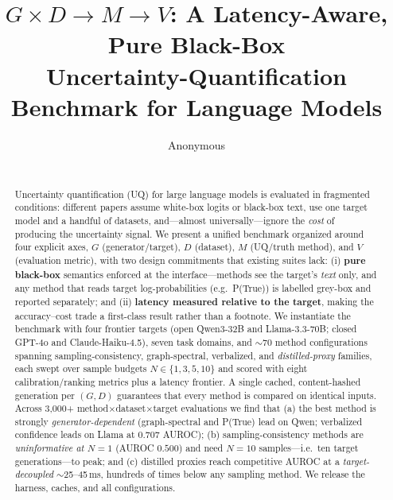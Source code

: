 \documentclass[11pt]{article}
\title{$G\times D\to M\to V$: A Latency-Aware, Pure Black-Box \\
Uncertainty-Quantification Benchmark for Language Models}
\author{Anonymous \\ \texttt{} \\}
\begin{document}
\maketitle

\begin{abstract}
Uncertainty quantification (UQ) for large language models is evaluated in fragmented
conditions: different papers assume white-box logits or black-box text, use one target
model and a handful of datasets, and---almost universally---ignore the \emph{cost} of
producing the uncertainty signal. We present a unified benchmark organized around four
explicit axes, $G$ (generator/target), $D$ (dataset), $M$ (UQ/truth method), and $V$
(evaluation metric), with two design commitments that existing suites lack: (i)
\textbf{pure black-box} semantics enforced at the interface---methods see the target's
\emph{text} only, and any method that reads target log-probabilities (e.g.\ P(True)) is
labelled grey-box and reported separately; and (ii) \textbf{latency measured relative to
the target}, making the accuracy--cost trade a first-class result rather than a
footnote. We instantiate the benchmark with four frontier targets (open Qwen3-32B and
Llama-3.3-70B; closed GPT-4o and Claude-Haiku-4.5), seven task domains, and $\sim$70
method configurations spanning sampling-consistency, graph-spectral, verbalized, and
\emph{distilled-proxy} families, each swept over sample budgets $N\in\{1,3,5,10\}$ and
scored with eight calibration/ranking metrics plus a latency frontier. A single cached,
content-hashed generation per $(G,D)$ guarantees that every method is compared on
identical inputs. Across 3{,}000+ method$\times$dataset$\times$target evaluations we find
that (a) the best method is strongly \emph{generator-dependent} (graph-spectral and
P(True) lead on Qwen; verbalized confidence leads on Llama at 0.707 AUROC); (b)
sampling-consistency methods are \emph{uninformative at $N{=}1$} (AUROC $0.500$) and need
$N{=}10$ samples---i.e.\ ten target generations---to peak; and (c) distilled proxies
reach competitive AUROC at a \emph{target-decoupled} $\sim$25--45\,ms, hundreds of times
below any sampling method. We release the harness, caches, and all configurations.
\end{abstract}

\end{document}
